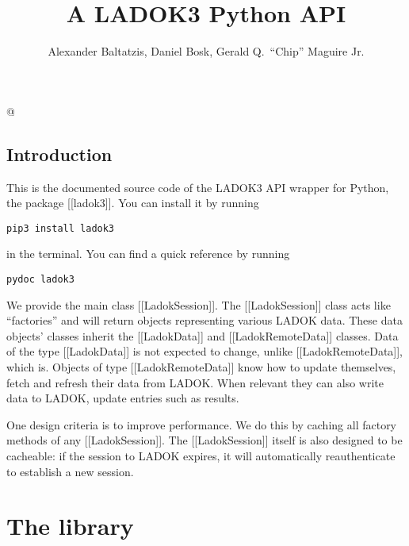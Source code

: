 \documentclass[a4paper]{report}
\title{%
  A LADOK3 Python API
}
\author{%
  Alexander Baltatzis,
  Daniel Bosk,
  Gerald Q.\ \enquote{Chip} Maguire Jr.
}
\affil{%
  KTH EECS\\
  \texttt{\{alba,dbosk,maguire\}@kth.se}
}
\begin{document}
\maketitle

\vspace*{\fill}
\clearpage

\begin{abstract}
  
\end{abstract}
\clearpage

\tableofcontents
\clearpage

@
\chapter{Introduction}

This is the documented source code of the LADOK3 API wrapper for Python, the 
package [[ladok3]].
You can install it by running
\begin{verbatim}
pip3 install ladok3
\end{verbatim}
in the terminal.
You can find a quick reference by running
\begin{verbatim}
pydoc ladok3
\end{verbatim}

We provide the main class [[LadokSession]].
The [[LadokSession]] class acts like \enquote{factories} and will return 
objects representing various LADOK data.
These data objects' classes inherit the [[LadokData]] and [[LadokRemoteData]] 
classes.
Data of the type [[LadokData]] is not expected to change, unlike 
[[LadokRemoteData]], which is.
Objects of type [[LadokRemoteData]] know how to update themselves, \ie fetch 
and refresh their data from LADOK.
When relevant they can also write data to LADOK, \ie update entries such as 
results.

One design criteria is to improve performance.
We do this by caching all factory methods of any [[LadokSession]].
The [[LadokSession]] itself is also designed to be cacheable: if the session to 
LADOK expires, it will automatically reauthenticate to establish a new session.



\part{The library}


\end{document}

